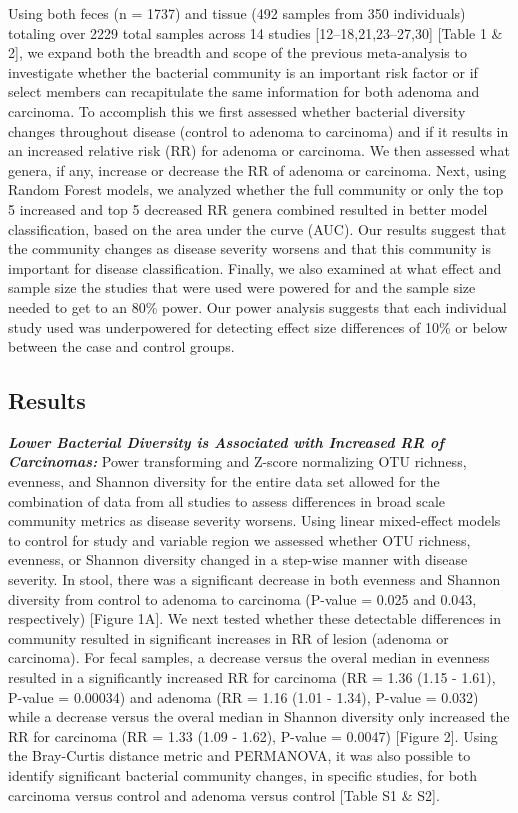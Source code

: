 \documentclass[12pt,]{article}
\begin{document}
Using both feces (n = 1737) and tissue (492 samples from 350
individuals) totaling over 2229 total samples across 14 studies
{[}12--18,21,23--27,30{]} {[}Table 1 \& 2{]}, we expand both the breadth
and scope of the previous meta-analysis to investigate whether the
bacterial community is an important risk factor or if select members can
recapitulate the same information for both adenoma and carcinoma. To
accomplish this we first assessed whether bacterial diversity changes
throughout disease (control to adenoma to carcinoma) and if it results
in an increased relative risk (RR) for adenoma or carcinoma. We then
assessed what genera, if any, increase or decrease the RR of adenoma or
carcinoma. Next, using Random Forest models, we analyzed whether the
full community or only the top 5 increased and top 5 decreased RR genera
combined resulted in better model classification, based on the area
under the curve (AUC). Our results suggest that the community changes as
disease severity worsens and that this community is important for
disease classification. Finally, we also examined at what effect and
sample size the studies that were used were powered for and the sample
size needed to get to an 80\% power. Our power analysis suggests that
each individual study used was underpowered for detecting effect size
differences of 10\% or below between the case and control groups.

\newpage

\subsection{Results}\label{results}

\textbf{\emph{Lower Bacterial Diversity is Associated with Increased RR
of Carcinomas:}} Power transforming and Z-score normalizing OTU
richness, evenness, and Shannon diversity for the entire data set
allowed for the combination of data from all studies to assess
differences in broad scale community metrics as disease severity
worsens. Using linear mixed-effect models to control for study and
variable region we assessed whether OTU richness, evenness, or Shannon
diversity changed in a step-wise manner with disease severity. In stool,
there was a significant decrease in both evenness and Shannon diversity
from control to adenoma to carcinoma (P-value = 0.025 and 0.043,
respectively) {[}Figure 1A{]}. We next tested whether these detectable
differences in community resulted in significant increases in RR of
lesion (adenoma or carcinoma). For fecal samples, a decrease versus the
overal median in evenness resulted in a significantly increased RR for
carcinoma (RR = 1.36 (1.15 - 1.61), P-value = 0.00034) and adenoma (RR =
1.16 (1.01 - 1.34), P-value = 0.032) while a decrease versus the overal
median in Shannon diversity only increased the RR for carcinoma (RR =
1.33 (1.09 - 1.62), P-value = 0.0047) {[}Figure 2{]}. Using the
Bray-Curtis distance metric and PERMANOVA, it was also possible to
identify significant bacterial community changes, in specific studies,
for both carcinoma versus control and adenoma versus control {[}Table S1
\& S2{]}.
\end{document}
